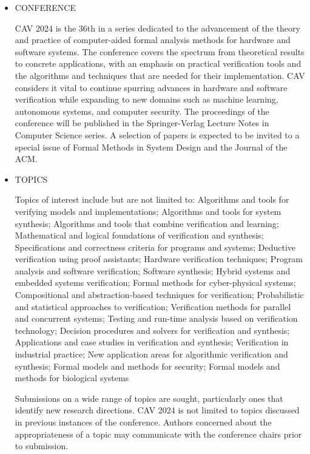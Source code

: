 \documentclass[prodmode,acmtecs]{acmsmall} %
\begin{document}
\begin{itemize}\item CONFERENCE 
 
  CAV 2024 is the 36th in a series dedicated to the advancement of the theory and practice of computer-aided formal analysis methods for hardware and software systems. The conference covers the spectrum from theoretical results to concrete applications, with an emphasis on practical verification tools and the algorithms and techniques that are needed for their implementation. CAV considers it vital to continue spurring advances in hardware and software verification while expanding to new domains such as machine learning, autonomous systems, and computer security. The proceedings of the conference will be published in the Springer-Verlag Lecture Notes in Computer Science series. A selection of papers is expected to be invited to a special issue of Formal Methods in System Design and the Journal of the ACM. 
 
\item  TOPICS 
 
  Topics of interest include but are not limited to: Algorithms and tools for verifying models and implementations; Algorithms and tools for system synthesis; Algorithms and tools that combine verification and learning; Mathematical and logical foundations of verification and synthesis; Specifications and correctness criteria for programs and systems; Deductive verification using proof assistants; Hardware verification techniques; Program analysis and software verification; Software synthesis; Hybrid systems and embedded systems verification; Formal methods for cyber-physical systems; Compositional and abstraction-based techniques for verification; Probabilistic and statistical approaches to verification; Verification methods for parallel and concurrent systems; Testing and run-time analysis based on verification technology; Decision procedures and solvers for verification and synthesis; Applications and case studies in verification and synthesis; Verification in industrial practice; New application areas for algorithmic verification and synthesis; Formal models and methods for security; Formal models and methods for biological systems  
 
    Submissions on a wide range of topics are sought, particularly ones that identify new research directions. CAV 2024 is not limited to topics discussed in previous instances of the conference. Authors concerned about the appropriateness of a topic may communicate with the conference chairs prior to submission. 
 

\end{itemize}
\end{document}
